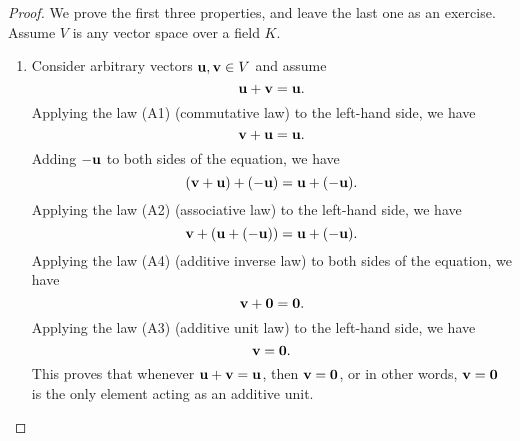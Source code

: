 \begin{proof}
  We prove the first three properties, and leave the last one as an
  exercise. Assume $V$ is any vector space over a field $K$.
  \begin{enumerate}
  \item Consider arbitrary vectors $\mbox{\bf u},\mbox{\bf v}\in V$ and assume
    \begin{equation*}
      \mbox{\bf u}+\mbox{\bf v}=\mbox{\bf u}.
    \end{equation*}
    Applying the law (A1) (commutative law) to the left-hand side, we have
    \begin{equation*}
      \mbox{\bf v}+\mbox{\bf u}=\mbox{\bf u}.
    \end{equation*}
    Adding $-\mbox{\bf u}$ to both sides of the equation, we have
    \begin{equation*}
      (\mbox{\bf v}+\mbox{\bf u})+(-\mbox{\bf u}) = \mbox{\bf u}+(-\mbox{\bf u}).
    \end{equation*}
    Applying the law (A2) (associative law) to the left-hand side, we
    have
    \begin{equation*}
      \mbox{\bf v}+(\mbox{\bf u}+(-\mbox{\bf u})) = \mbox{\bf u}+(-\mbox{\bf u}).
    \end{equation*}
    Applying the law (A4) (additive inverse law) to both sides of the
    equation, we have
    \begin{equation*}
      \mbox{\bf v}+\mbox{\bf 0} = \mbox{\bf 0}.
    \end{equation*}
    Applying the law (A3) (additive unit law) to the left-hand side,
    we have
    \begin{equation*}
      \mbox{\bf v} = \mbox{\bf 0}.
    \end{equation*}
    This proves that whenever $\mbox{\bf u}+\mbox{\bf v}=\mbox{\bf u}$, then
    $\mbox{\bf v} = \mbox{\bf 0}$, or in other words, $\mbox{\bf v} = \mbox{\bf 0}$ is
    the only element acting as an additive unit.
    

\end{enumerate}
\end{proof}
